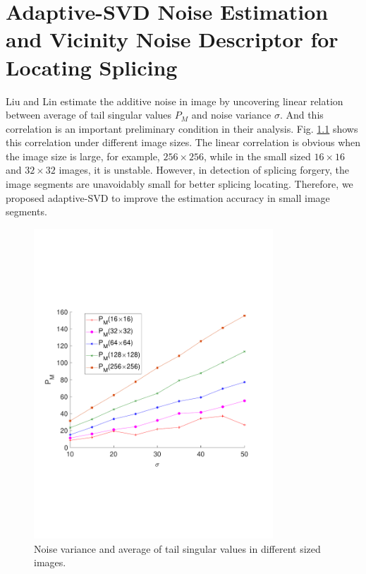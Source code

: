 \documentclass[a4paper, 12pt, twoside]{report}
\begin{document}
\chapter{Adaptive-SVD Noise Estimation and Vicinity Noise Descriptor for Locating Splicing}\label{s2}
Liu and Lin \cite{RN54} estimate the additive noise in image by uncovering linear relation between average of tail singular values ${{P}_{M}}$ and noise variance $\sigma $. And this correlation is an important preliminary condition in their analysis.  Fig. \ref{tip13c} shows this correlation under different image sizes. The linear correlation is obvious when the image size is large, for example, $256\times 256$, while in the small sized $16\times 16$ and $32\times 32$ images, it is unstable. However, in detection of splicing forgery, the image segments are unavoidably small for better splicing locating. Therefore, we proposed adaptive-SVD to improve the estimation accuracy in small image segments. 
\begin{figure}[!htbp]
	\centering
	\includegraphics[width=0.8\textwidth]{tip13c}
	\caption{Noise variance and average of tail singular values in different sized images.}
	\label{tip13c}
\end{figure}
\end{document}
